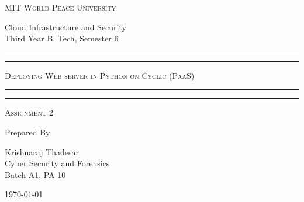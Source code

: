 \documentclass[11pt]{article}
\begin{document}
\begin{titlepage}
    \centering


    \huge\textsc{
        MIT World Peace University
    }\\

    \vspace{0.75\baselineskip} %

    \LARGE{
        Cloud Infrastructure and Security\\
        Third Year B. Tech, Semester 6
    }

    \vfill %


    \rule{\textwidth}{1.6pt}\vspace*{-\baselineskip}\vspace*{2pt}
    \rule{\textwidth}{0.6pt}
    \vspace{0.75\baselineskip} %



    \huge{\textsc{
            Deploying Web server in Python on Cyclic (PaaS)
        }} \\



    \vspace{0.5\baselineskip} %
    \rule{\textwidth}{0.6pt}\vspace*{-\baselineskip}\vspace*{2.8pt}
    \rule{\textwidth}{1.6pt}

    \vspace{1\baselineskip} %


    \LARGE\textsc{
        Assignment 2
    } %
    \vfill


    Prepared By
    \vspace{0.5\baselineskip} %

    \Large{
        Krishnaraj Thadesar \\
        Cyber Security and Forensics\\
        Batch A1, PA 10
    }


    \vspace{0.5\baselineskip} %
    \today

\end{titlepage}
\end{document}
